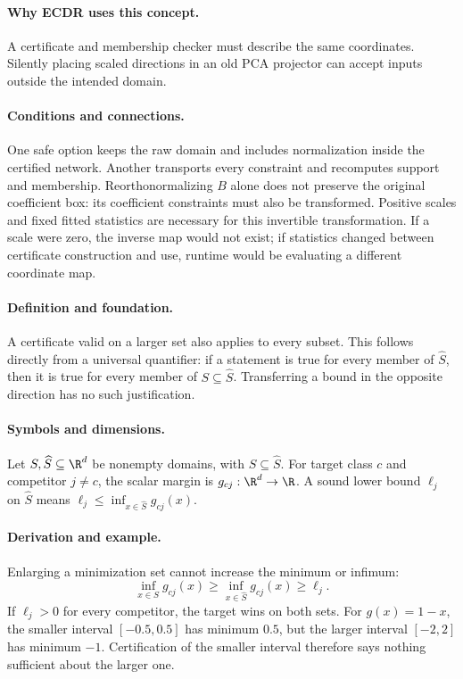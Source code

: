 \paragraph{Why ECDR uses this concept.}
A certificate and membership checker must describe the same coordinates. Silently placing scaled directions in an old PCA projector can accept inputs outside the intended domain.
\paragraph{Conditions and connections.}
One safe option keeps the raw domain and includes normalization inside the certified network. Another transports every constraint and recomputes support and membership. Reorthonormalizing $B$ alone does not preserve the original coefficient box: its coefficient constraints must also be transformed. Positive scales and fixed fitted statistics are necessary for this invertible transformation. If a scale were zero, the inverse map would not exist; if statistics changed between certificate construction and use, runtime would be evaluating a different coordinate map.

\paragraph{Definition and foundation.}
A certificate valid on a larger set also applies to every subset. This follows directly from a universal quantifier: if a statement is true for every member of $\widehat S$, then it is true for every member of $S\subseteq\widehat S$. Transferring a bound in the opposite direction has no such justification.
\paragraph{Symbols and dimensions.}
Let $S,\widehat S\subseteq\R^d$ be nonempty domains, with $S\subseteq\widehat S$. For target class $c$ and competitor $j\ne c$, the scalar margin is $g_{cj}:\R^d\to\R$. A sound lower bound $\ell_j$ on $\widehat S$ means $\ell_j\le\inf_{x\in\widehat S}g_{cj}(x)$.
\paragraph{Derivation and example.}
Enlarging a minimization set cannot increase the minimum or infimum:
\[
 \inf_{x\in S}g_{cj}(x)\ge
 \inf_{x\in\widehat S}g_{cj}(x)\ge\ell_j.
\]
If $\ell_j>0$ for every competitor, the target wins on both sets. For $g(x)=1-x$, the smaller interval $[-0.5,0.5]$ has minimum $0.5$, but the larger interval $[-2,2]$ has minimum $-1$. Certification of the smaller interval therefore says nothing sufficient about the larger one.
